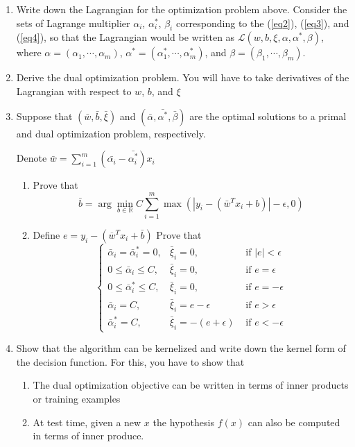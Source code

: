 \documentclass{article}
\newcommand{\real}{\mathbb{R}}
\def\real{{\mathbb {R}}}
\begin{document}
\begin{enumerate}[label=(\alph*)]
    \item Write down the Lagrangian for the optimization problem above. Consider the sets of Lagrange multiplier $\alpha_i$, $\alpha_i^*$, $\beta_i$ corresponding to the (\ref{eq2}), (\ref{eq3}), and (\ref{eq4}), so that the Lagrangian would be written as $\mathcal{L}(w, b, \xi, \alpha, \alpha^*, \beta)$, where $\alpha = (\alpha_1, \cdots, \alpha_m)$, $\alpha^* = (\alpha_1^*, \cdots, \alpha_m^*)$, and $\beta = (\beta_1, \cdots, \beta_m)$.
    \item Derive the dual optimization problem. You will have to take derivatives of the Lagrangian with respect to $w$, $b$, and $\xi$
    \item Suppose that $(\bar{w}, \bar{b}, \bar{\xi})$ and $(\bar{\alpha}, \bar{\alpha^*}, \bar{\beta})$ are the optimal solutions to a primal and dual optimization problem, respectively. 
    
    Denote $\bar{w} = \sum_{i=1}^m (\bar{\alpha_i} - \bar{\alpha_i^*})x_i$
    \begin{enumerate}[label=(\arabic*)]
        \item Prove that 
        \begin{equation}  
            \bar{b} = \arg\min_{b\in\real}C\sum_{i=1}^m \max(|y_i - (\bar{w}^Tx_i + b)|-\epsilon, 0)
        \end{equation}
        \item Define $e=y_i - \left(\overline{w}^T x_i+\bar{b}\right)$ Prove that
        \begin{equation}
            \left\{\begin{array}{lll}
            \bar{\alpha}_i=\bar{\alpha}_i^*=0, & \bar{\xi}_i =0, & \text { if } |e|<\epsilon \\
            0 \leq \bar{\alpha}_i \leq C, & \bar{\xi}_i =0, & \text { if } e=\epsilon  \\
            0 \leq \bar{\alpha}_i^* \leq C, & \bar{\xi}_i=0, & \text { if } e=-\epsilon  \\
            \bar{\alpha}_i=C, & \bar{\xi}_i=e-\epsilon & \text{ if } e>\epsilon\\
            \bar{\alpha}_i^*=C, & \bar{\xi}_i=-(e+\epsilon) & \text{ if } e<-\epsilon
            \end{array}\right.
        \end{equation}
    \end{enumerate}
    \item Show that the algorithm can be kernelized and write down the kernel form of the decision function. For this, you have to show that
    \begin{enumerate}[label=(\arabic*)]
        \item The dual optimization objective can be written  in terms of inner products or training examples
        \item At test time, given a new $x$ the hypothesis $f(x)$ can also be computed in terms of inner produce.
    \end{enumerate}
\end{enumerate}
\end{document}
